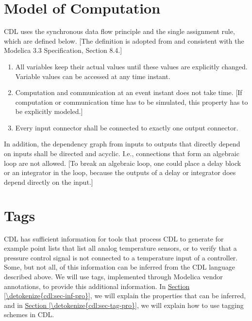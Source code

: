 \documentclass[letterpaper,10pt, openany,english]{sphinxmanual}
\begin{document}
\section{Model of Computation}
\label{\detokenize{cdl:model-of-computation}}
CDL uses the synchronous data flow principle and the single assignment rule,
which are defined below. {[}The definition is adopted from and consistent with the Modelica 3.3 Specification, Section 8.4.{]}
\begin{enumerate}
\def\theenumi{\arabic{enumi}}
\def\labelenumi{\theenumi .}
\makeatletter\def\p@enumii{\p@enumi \theenumi .}\makeatother
\item {} 
All variables keep their actual values until these values
are explicitly changed. Variable values can be accessed at any time instant.

\item {} 
Computation and communication at an event instant does not take time.
{[}If computation or communication time has to be simulated, this property has to be explicitly modeled.{]}

\item {} 
Every input connector shall be connected to exactly one output connector.

\end{enumerate}

In addition, the dependency graph from inputs to outputs that directly depend
on inputs shall be directed and acyclic.
I.e., connections that form an algebraic loop are not allowed.
{[}To break an algebraic loop, one could place a delay block or an integrator
in the loop, because the outputs of a delay or integrator does  depend
directly on the input.{]}


\section{Tags}
\label{\detokenize{cdl:tags}}
CDL has sufficient information for tools that process CDL to
generate for example point lists that list all analog temperature sensors,
or to verify that a pressure control signal is not connected to a temperature
input of a controller.
Some, but not all, of this information can be inferred from the CDL language described above.
We will use tags, implemented through Modelica vendor annotations,
to provide this additional information.
In \hyperref[\detokenize{cdl:sec-inf-pro}]{Section \ref{\detokenize{cdl:sec-inf-pro}}}, we will explain the properties that can be inferred,
and in \hyperref[\detokenize{cdl:sec-tag-pro}]{Section \ref{\detokenize{cdl:sec-tag-pro}}}, we will explain how to use
tagging schemes in CDL.
\end{document}
